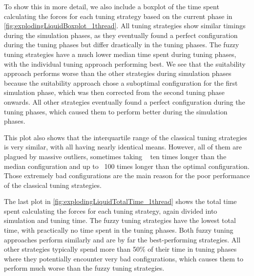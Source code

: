 To show this in more detail, we also include a boxplot of the time spent calculating the forces for each tuning strategy based on the current phase in \autoref{fig:explodingLiquidBoxplot_1thread}. All tuning strategies show similar timings during the simulation phases, as they eventually found a perfect configuration during the tuning phases but differ drastically in the tuning phases. The fuzzy tuning strategies have a much lower median time spent during tuning phases, with the individual tuning approach performing best. We see that the suitability approach performs worse than the other strategies during simulation phases because the suitability approach chose a suboptimal configuration for the first simulation phase, which was then corrected from the second tuning phase onwards. All other strategies eventually found a perfect configuration during the tuning phases, which caused them to perform better during the simulation phases.

This plot also shows that the interquartile range of the classical tuning strategies is very similar, with all having nearly identical means. However, all of them are plagued by massive outliers, sometimes taking ~ ten times longer than the median configuration and up to ~100 times longer than the optimal configuration. Those extremely bad configurations are the main reason for the poor performance of the classical tuning strategies.

The last plot in \autoref{fig:explodingLiquidTotalTime_1thread} shows the total time spent calculating the forces for each tuning strategy, again divided into simulation and tuning time. The fuzzy tuning strategies have the lowest total time, with practically no time spent in the tuning phases. Both fuzzy tuning approaches perform similarly and are by far the best-performing strategies. All other strategies typically spend more than 50\% of their time in tuning phases where they potentially encounter very bad configurations, which causes them to perform much worse than the fuzzy tuning strategies.




